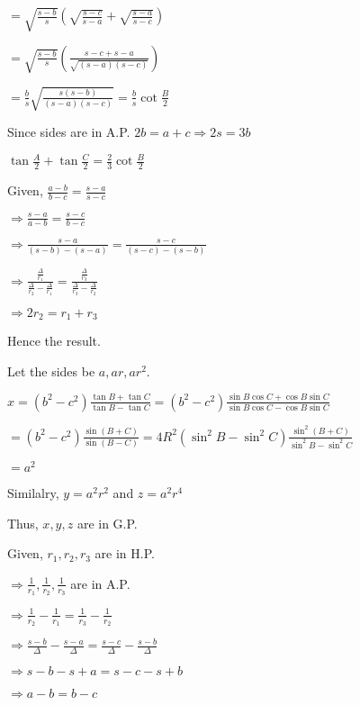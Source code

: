   $= \sqrt{\frac{s - b}{s}}\left(\sqrt{\frac{s - c}{s - a}} + \sqrt{\frac{s - a}{s - c}}\right)$

  $= \sqrt{\frac{s - b}{s}} \left(\frac{s - c + s - a}{\sqrt{(s - a)(s - c)}}\right)$

  $= \frac{b}{s}\sqrt{\frac{s(s - b)}{(s - a)(s - c)}} = \frac{b}{s}\cot\frac{B}{2}$

  Since sides are in A.P. $2b = a + c \Rightarrow 2s = 3b$

  $\tan\frac{A}{2} + \tan\frac{C}{2} = \frac{2}{3}\cot\frac{B}{2}$

\item Given, $\frac{a - b}{b - c} = \frac{s - a}{s - c}$

  $\Rightarrow \frac{s - a}{a - b} = \frac{s - c}{b - c}$

  $\Rightarrow \frac{s - a}{(s - b) - (s - a)} = \frac{s - c}{(s - c) - (s - b)}$

  $\Rightarrow \frac{\frac{\Delta}{r_1}}{\frac{\Delta}{r_2} - \frac{\Delta}{r_1}} =
  \frac{\frac{\Delta}{r_3}}{\frac{\Delta}{r_3} - \frac{\Delta}{r_2}}$

  $\Rightarrow 2r_2 = r_1 + r_3$

  Hence the result.

\item Let the sides be $a, ar, ar^2.$

  $x = (b^2 - c^2)\frac{\tan B + \tan C}{\tan B - \tan C} = (b^2 - c^2)\frac{\sin B\cos C + \cos B\sin C}{\sin B\cos C -
  \cos B\sin C}$

  $= (b^2 - c^2)\frac{\sin(B + C)}{\sin(B - C)} = 4R^2(\sin^2B - \sin^2C)\frac{\sin^2(B + C)}{\sin^2B - \sin^2C}$

  $= a^2$

  Similalry, $y = a^2r^2$ and $z = a^2r^4$

  Thus, $x,y,z$ are in G.P.

\item Given, $r_1,r_2,r_3$ are in H.P.

  $\Rightarrow \frac{1}{r_1}, \frac{1}{r_2}, \frac{1}{r_3}$ are in A.P.

  $\Rightarrow \frac{1}{r_2} - \frac{1}{r_1} = \frac{1}{r_3}- \frac{1}{r_2}$

  $\Rightarrow \frac{s - b}{\Delta} - \frac{s - a}{\Delta} = \frac{s - c}{\Delta} - \frac{s - b}{\Delta}$

  $\Rightarrow s - b - s + a = s - c - s + b$

  $\Rightarrow a - b = b - c$

